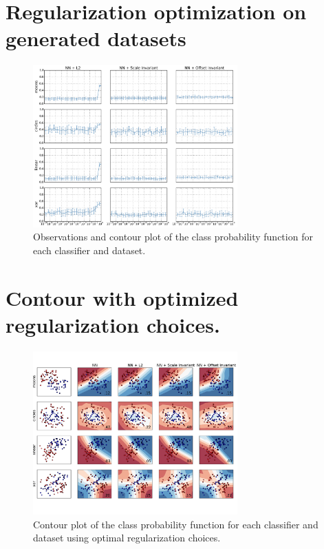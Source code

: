 
\onecolumn
\section{Regularization optimization on generated datasets}
\label{appendix:regualization-optimization}
\begin{figure}[H]
	\centering
	\includegraphics[width=0.7\textwidth]{plots/syntetic_reg_opt}
	\caption{Observations and contour plot of the class probability function for each classifier and dataset.}
\end{figure}

\section{Contour with optimized regularization choices.}
\label{appendix:generated-contour-optimized}
\begin{figure}[H]
	\centering
	\includegraphics[width=0.7\textwidth, trim = 0 2.2cm 0 1.5cm, clip]{plots/2d_classifier-optimized}
	\caption{Contour plot of the class probability function for each classifier and dataset using optimal regularization choices.}
\end{figure}

\twocolumn
